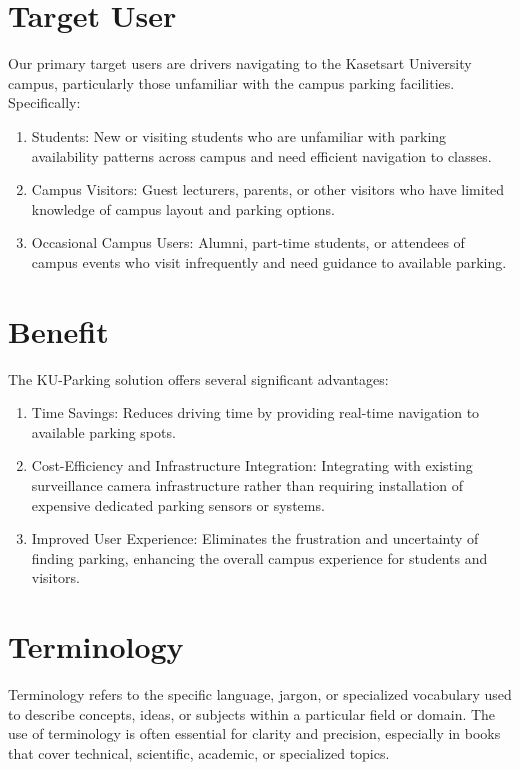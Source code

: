 \section{Target User}
\label{section:target-user}

Our primary target users are drivers navigating to the Kasetsart University campus, particularly those unfamiliar with the campus parking facilities. Specifically:
\begin{enumerate}[leftmargin=80pt]
\item Students: New or visiting students who are unfamiliar with parking availability patterns across campus and need efficient navigation to classes.
\item Campus Visitors: Guest lecturers, parents, or other visitors who have limited knowledge of campus layout and parking options.
\item Occasional Campus Users: Alumni, part-time students, or attendees of campus events who visit infrequently and need guidance to available parking.
\end{enumerate}
\section{Benefit}
\label{section:benefit}

The KU-Parking solution offers several significant advantages:

\begin{enumerate}[leftmargin=80pt]
    \item Time Savings: Reduces driving time by providing real-time navigation to available parking spots.
    
    \item Cost-Efficiency and Infrastructure Integration: Integrating with existing surveillance camera infrastructure rather than requiring installation of expensive dedicated parking sensors or systems.
    
    \item Improved User Experience: Eliminates the frustration and uncertainty of finding parking, enhancing the overall campus experience for students and visitors.
\end{enumerate}

\section{Terminology}
\label{section:terminology}

Terminology refers to the specific language, jargon, or
specialized vocabulary used to describe concepts, ideas, or subjects within a
particular field or domain. The use of terminology is often essential for clarity
and precision, especially in books that cover technical, scientific, academic, or
specialized topics.
